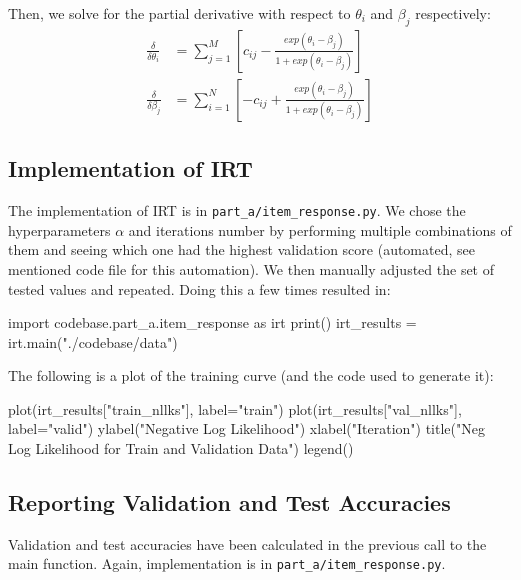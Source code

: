 \documentclass{article}
\begin{document}
    Then, we solve for the partial derivative with respect to $\theta_i$ and $\beta_j$ respectively:
    \begin{align*}
        \frac{\delta}{\delta\theta_{i}} &=  \sum_{j=1}^{M}{[c_{ij} - \frac{exp(\theta_{i} - \beta_{j})}{1+exp(\theta_{i} - \beta_{j})}]} \\
        \frac{\delta}{\delta\beta_{j}} &= \sum_{i=1}^{N}{[-c_{ij} + \frac{exp(\theta_{i} - \beta_{j})}{1+exp(\theta_{i} - \beta_{j})}]}
    \end{align*}
    
    \subsection{Implementation of IRT}
    The implementation of IRT is in \verb|part_a/item_response.py|. We chose the hyperparameters $\alpha$ and iterations number by performing multiple combinations of them and seeing which one had the highest validation score (automated, see mentioned code file for this automation). We then manually adjusted the set of tested values and repeated. Doing this a few times resulted in:

    \begin{pylabblock}
        import codebase.part_a.item_response as irt
        print()
        irt_results = irt.main("./codebase/data")
    \end{pylabblock}
    \printpythontex[verb]

    \medskip

    \noindent
    The following is a plot of the training curve (and the code used to generate it):
    \begin{pylabblock}
        plot(irt_results["train_nllks"], label="train")
        plot(irt_results["val_nllks"], label="valid")
        ylabel("Negative Log Likelihood")
        xlabel("Iteration")
        title("Neg Log Likelihood for Train and Validation Data")
        legend()
    \end{pylabblock}

    \subsection{Reporting Validation and Test Accuracies}

    Validation and test accuracies have been calculated in the previous call to the main function. Again, implementation is in \verb|part_a/item_response.py|.

    \medskip
\end{document}
